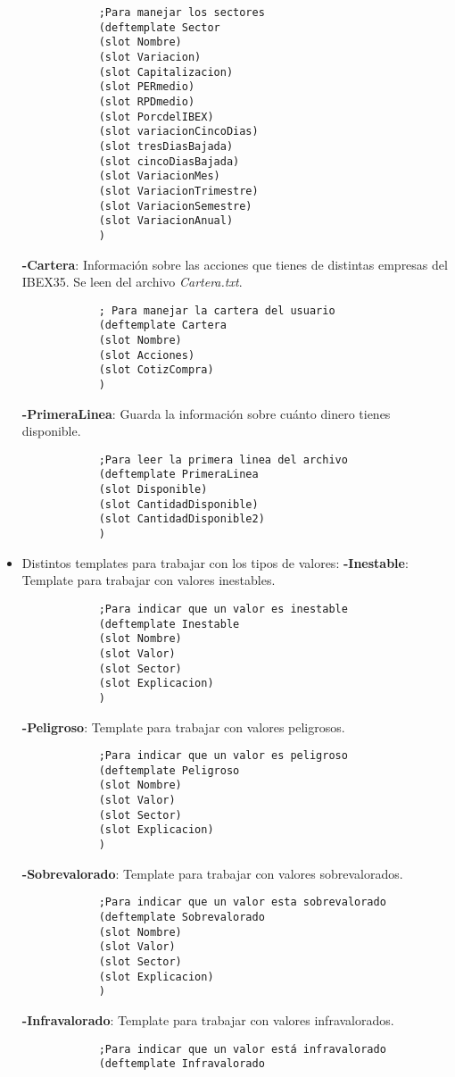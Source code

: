\begin{itemize}
			\begin{verbatim}
			;Para manejar los sectores
			(deftemplate Sector
			(slot Nombre)
			(slot Variacion)
			(slot Capitalizacion)
			(slot PERmedio)
			(slot RPDmedio)
			(slot PorcdelIBEX)
			(slot variacionCincoDias)
			(slot tresDiasBajada)
			(slot cincoDiasBajada)
			(slot VariacionMes)
			(slot VariacionTrimestre)
			(slot VariacionSemestre)
			(slot VariacionAnual)
			)
			\end{verbatim}
	\subitem \textbf{-Cartera}: Información sobre las acciones que tienes de distintas empresas del IBEX35. Se leen del archivo \textit{Cartera.txt}.
			\begin{verbatim}
			; Para manejar la cartera del usuario
			(deftemplate Cartera
			(slot Nombre)
			(slot Acciones)
			(slot CotizCompra)
			)
			\end{verbatim}
	\subitem \textbf{-PrimeraLinea}: Guarda la información sobre cuánto dinero tienes disponible.
			\begin{verbatim}
			;Para leer la primera linea del archivo
			(deftemplate PrimeraLinea
			(slot Disponible)
			(slot CantidadDisponible)
			(slot CantidadDisponible2)
			)
			\end{verbatim}
	\item Distintos templates para trabajar con los tipos de valores:
	\subitem \textbf{-Inestable}: Template para trabajar con valores inestables.
			\begin{verbatim}
			;Para indicar que un valor es inestable
			(deftemplate Inestable
			(slot Nombre)
			(slot Valor)
			(slot Sector)
			(slot Explicacion)
			)
			\end{verbatim}
	\subitem \textbf{-Peligroso}: Template para trabajar con valores peligrosos.
			\begin{verbatim}
			;Para indicar que un valor es peligroso
			(deftemplate Peligroso
			(slot Nombre)
			(slot Valor)
			(slot Sector)
			(slot Explicacion)
			)
			\end{verbatim}
	\subitem \textbf{-Sobrevalorado}: Template para trabajar con valores sobrevalorados.
			\begin{verbatim}
			;Para indicar que un valor esta sobrevalorado
			(deftemplate Sobrevalorado
			(slot Nombre)
			(slot Valor)
			(slot Sector)
			(slot Explicacion)
			)
			\end{verbatim}
	\subitem \textbf{-Infravalorado}: Template para trabajar con valores infravalorados.
			\begin{verbatim}
			;Para indicar que un valor está infravalorado
			(deftemplate Infravalorado

\end{verbatim}
\end{itemize}
